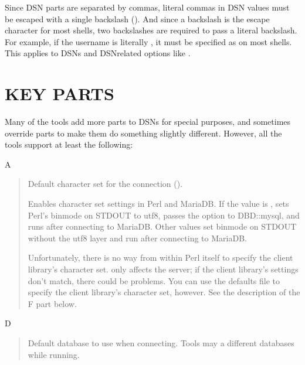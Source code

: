 \documentclass[letterpaper,10pt,english]{sphinxmanual}
\begin{document}
Since DSN parts are separated by commas, literal commas in DSN values must
be escaped with a single backslash (\sphinxcode{\sphinxupquote{\textbackslash{}}}).  And since a backslash is
the escape character for most shells, two backslashes are required to pass
a literal backslash.  For example, if the username is literally ,
it must be specified as  on most shells.  This applies to DSNs
and DSN\sphinxhyphen{}related options like .


\section{KEY PARTS}
\label{\detokenize{dsn_data_source_name_specifications:key-parts}}
Many of the tools add more parts to DSNs for special purposes, and sometimes
override parts to make them do something slightly different.  However, all the
tools support at least the following:

A
\begin{quote}

Default character set for the connection ().

Enables character set settings in Perl and MariaDB.  If the value is ,
sets Perl’s binmode on STDOUT to utf8, passes the  option
to DBD::mysql, and runs  after connecting to MariaDB.  Other
values set binmode on STDOUT without the utf8 layer and run  after
connecting to MariaDB.

Unfortunately, there is no way from within Perl itself to specify the client
library’s character set.   only affects the server; if the client
library’s settings don’t match, there could be problems.  You can use the
defaults file to specify the client library’s character set, however.  See the
description of the F part below.
\end{quote}

D
\begin{quote}

Default database to use when connecting.  Tools may  a different
databases while running.
\end{quote}
\end{document}
